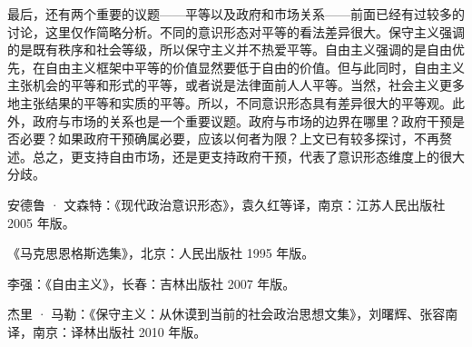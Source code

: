 最后，还有两个重要的议题——平等以及政府和市场关系——前面已经有过较多的讨论，这里仅作简略分析。不同的意识形态对平等的看法差异很大。保守主义强调的是既有秩序和社会等级，所以保守主义并不热爱平等。自由主义强调的是自由优先，在自由主义框架中平等的价值显然要低于自由的价值。但与此同时，自由主义主张机会的平等和形式的平等，或者说是法律面前人人平等。当然，社会主义更多地主张结果的平等和实质的平等。所以，不同意识形态具有差异很大的平等观。此外，政府与市场的关系也是一个重要议题。政府与市场的边界在哪里？政府干预是否必要？如果政府干预确属必要，应该以何者为限？上文已有较多探讨，不再赘述。总之，更支持自由市场，还是更支持政府干预，代表了意识形态维度上的很大分歧。


安德鲁 · 文森特：《现代政治意识形态》，袁久红等译，南京：江苏人民出版社 2005 年版。

《马克思恩格斯选集》，北京：人民出版社 1995 年版。

李强：《自由主义》，长春：吉林出版社 2007 年版。

杰里 · 马勒：《保守主义：从休谟到当前的社会政治思想文集》，刘曙辉、张容南译，南京：译林出版社 2010 年版。
